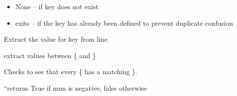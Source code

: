 \documentclass[letterpaper,10pt,english]{sphinxmanual}
\begin{document}
\begin{fulllineitems}
\begin{fulllineitems}
\begin{description}
\begin{itemize}
\item {} 
None -- if key does not exist

\item {} 
exits -- if the key has already been defined to prevent duplicate confusion

\end{itemize}

\end{description}

\end{fulllineitems}


\begin{fulllineitems}
\label{pydfnworks:pydfnworks.helper.input_helper.find_val}
Extract the value for key from line.

\end{fulllineitems}


\begin{fulllineitems}
\label{pydfnworks:pydfnworks.helper.input_helper.get_groups}
extract values between \{ and \}

\end{fulllineitems}


\begin{fulllineitems}
\label{pydfnworks:pydfnworks.helper.input_helper.has_curlys}
Checks to see that every \{ has a matching \}.

\end{fulllineitems}


\begin{fulllineitems}
\label{pydfnworks:pydfnworks.helper.input_helper.is_negative}
``returns True if num is negative, false otherwise

\end{fulllineitems}


\end{fulllineitems}
\end{document}
